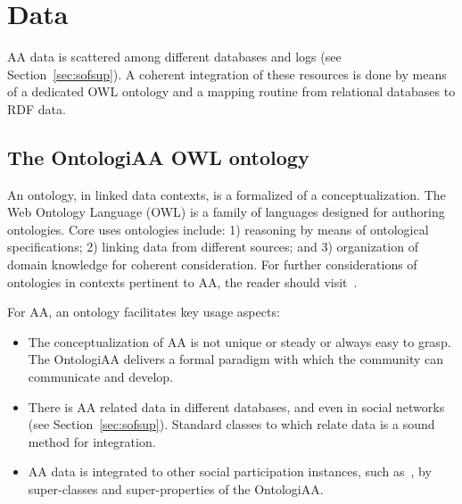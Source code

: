 \documentclass[12pt,fleqn]{article}
\begin{document}
\section{Data}\label{sec:data}
AA data is scattered among different databases and logs (see Section~\ref{sec:sofsup}).
A coherent integration of these resources is done by means of a dedicated OWL ontology
and a mapping routine from relational databases to RDF data.

\subsection{The OntologiAA OWL ontology}\label{sec:ont}
An ontology, in linked data contexts, is a formalized of a conceptualization.
The Web Ontology Language (OWL) is a family of languages designed for authoring ontologies.
Core uses ontologies include: 1) reasoning by means of ontological specifications;
2) linking data from different sources; and 3) organization of domain knowledge for coherent consideration.
For further considerations of ontologies in contexts pertinent to AA, the reader should visit~\cite{ops,pnud5}.

For AA, an ontology facilitates key usage aspects:
\begin{itemize}
    \item The conceptualization of AA is not unique or steady or always easy to grasp.
	    The OntologiAA delivers a formal paradigm with which the community can communicate and develop.
    \item There is AA related data in different databases,
	    and even in social networks (see Section~\ref{sec:sofsup}).
		Standard classes to which relate data is a sound method for integration.
    \item AA data is integrated to other social participation instances,
	    such as~\cite{participa,cd}, by super-classes and super-properties of the OntologiAA.
\end{itemize}
\end{document}
